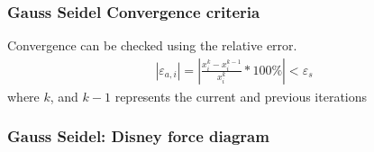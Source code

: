 \documentclass[notes]{beamer}
\begin{document}
\begin{frame}
	\frametitle{Gauss Seidel Convergence criteria}
	Convergence can be checked using the relative error.
	\begin{align*}
	\left|\varepsilon_{a, i}\right| = \left|\frac{x_i^k - x_i^{k-1}}{x_i^k}*100\% \right|< \varepsilon_s
	\end{align*}
	where $k$, and $k-1$ represents the current and previous iterations
\end{frame}



\begin{frame}
	\frametitle{Gauss Seidel: Disney force diagram}
\end{frame}
\end{document}
